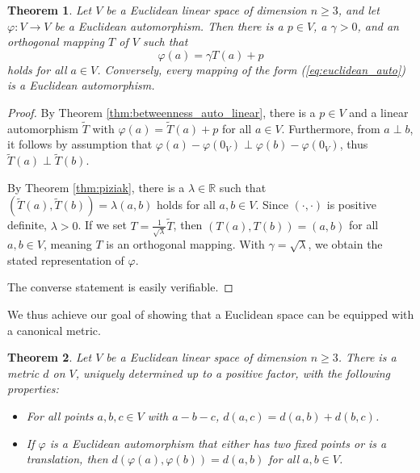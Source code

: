 \documentclass[11pt,a4paper]{article}
\newcommand{\betw}[3]{#1 - #2 - #3}
\newtheorem{theorem}{Theorem}[section]
\begin{document}
\begin{theorem} \label{thm:euclidean_auto_representation}
Let $V$ be a Euclidean linear space of dimension $n \ge 3$, and let $\varphi: V \to V$ be a Euclidean automorphism. Then there is a $p \in V$, a $\gamma > 0$, and an orthogonal mapping $T$ of $V$ such that
\begin{equation} \label{eq:euclidean_auto}
    \varphi(a) = \gamma T(a) + p
\end{equation}
holds for all $a \in V$.
Conversely, every mapping of the form (\ref{eq:euclidean_auto}) is a Euclidean automorphism.
\end{theorem}

\begin{proof}
By Theorem \ref{thm:betweenness_auto_linear}, there is a $p \in V$ and a linear automorphism $\tilde{T}$ with $\varphi(a) = \tilde{T}(a) + p$ for all $a \in V$. Furthermore, from $a \perp b$, it follows by assumption that $\varphi(a) - \varphi(0_V) \perp \varphi(b) - \varphi(0_V)$, thus $\tilde{T}(a) \perp \tilde{T}(b)$.

By Theorem \ref{thm:piziak}, there is a $\lambda \in \mathbb{R}$ such that $(\tilde{T}(a), \tilde{T}(b)) = \lambda(a, b)$ holds for all $a, b \in V$. Since $(\cdot, \cdot)$ is positive definite, $\lambda > 0$. If we set $T = \frac{1}{\sqrt{\lambda}}\tilde{T}$, then $(T(a), T(b)) = (a, b)$ for all $a, b \in V$, meaning $T$ is an orthogonal mapping. With $\gamma = \sqrt{\lambda}$, we obtain the stated representation of $\varphi$.

The converse statement is easily verifiable.
\end{proof}

We thus achieve our goal of showing that a Euclidean space can be equipped with a canonical metric.

\begin{theorem} \label{thm:metric}
Let $V$ be a Euclidean linear space of dimension $n \ge 3$. There is a metric $d$ on $V$, uniquely determined up to a positive factor, with the following properties:
\begin{itemize}
    \item[(M1)] For all points $a, b, c \in V$ with $\betw{a}{b}{c}$, $d(a, c) = d(a, b) + d(b, c)$.
    \item[(M2)] If $\varphi$ is a Euclidean automorphism that either has two fixed points or is a translation, then $d(\varphi(a), \varphi(b)) = d(a, b)$ for all $a, b \in V$.
\end{itemize}
\end{theorem}
\end{document}
